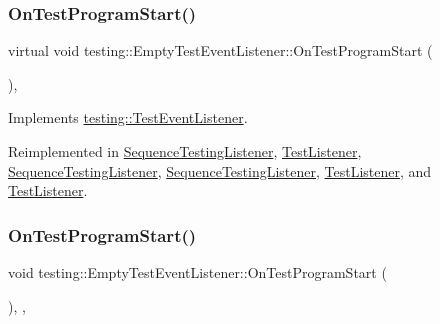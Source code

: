 \subsubsection{\texorpdfstring{OnTestProgramStart()}{OnTestProgramStart()}\hspace{0.1cm}{\footnotesize\ttfamily [1/3]}}
{\footnotesize\ttfamily virtual void testing\+::\+Empty\+Test\+Event\+Listener\+::\+On\+Test\+Program\+Start (\begin{DoxyParamCaption}\item[{const \mbox{\hyperlink{classtesting_1_1_unit_test}{Unit\+Test}} \&}]{ }\end{DoxyParamCaption})\hspace{0.3cm}{\ttfamily [inline]}, {\ttfamily [virtual]}}



Implements \mbox{\hyperlink{classtesting_1_1_test_event_listener_a5f6c84f39851e8a603a2d2e10063816b}{testing\+::\+Test\+Event\+Listener}}.



Reimplemented in \mbox{\hyperlink{class_sequence_testing_listener_a25b96acdbaa6f582e583e6b56bd39b42}{Sequence\+Testing\+Listener}}, \mbox{\hyperlink{class_test_listener_a6218f522f5b6b37050ff0ea630ac5fd3}{Test\+Listener}}, \mbox{\hyperlink{class_sequence_testing_listener_a2dcf940322a480b210d8e5e934dd0a79}{Sequence\+Testing\+Listener}}, \mbox{\hyperlink{class_sequence_testing_listener_a2dcf940322a480b210d8e5e934dd0a79}{Sequence\+Testing\+Listener}}, \mbox{\hyperlink{class_test_listener_ab1edf894efc1104f7ce35563bc24de23}{Test\+Listener}}, and \mbox{\hyperlink{class_test_listener_ab1edf894efc1104f7ce35563bc24de23}{Test\+Listener}}.

\mbox{\label{classtesting_1_1_empty_test_event_listener_ac3f5033fcd82080edb45f546ce9854fe}} 
\subsubsection{\texorpdfstring{OnTestProgramStart()}{OnTestProgramStart()}\hspace{0.1cm}{\footnotesize\ttfamily [2/3]}}
{\footnotesize\ttfamily void testing\+::\+Empty\+Test\+Event\+Listener\+::\+On\+Test\+Program\+Start (\begin{DoxyParamCaption}\item[{const \mbox{\hyperlink{classtesting_1_1_unit_test}{Unit\+Test}} \&}]{ }\end{DoxyParamCaption})\hspace{0.3cm}{\ttfamily [inline]}, {\ttfamily [override]}, {\ttfamily [virtual]}}



